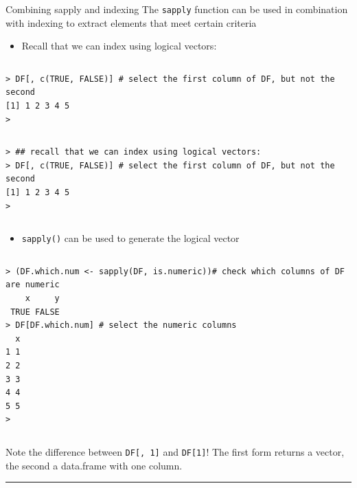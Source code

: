 \documentclass[table,smaller]{beamer}
\begin{document}
\begin{frame}[fragile,label=sec-4-3]{Combining sapply and indexing}
 The \texttt{sapply} function can be used in combination with indexing to extract elements that meet certain criteria
\begin{itemize}
\item Recall that we can index using logical vectors:
\end{itemize}
\vspace{-.5em}
\begin{columns}
\begin{block}{}
\begin{verbatim}
> DF[, c(TRUE, FALSE)] # select the first column of DF, but not the second
[1] 1 2 3 4 5
>
\end{verbatim}
\end{block}
\end{columns}
\vspace{.5em}

\vspace{-.5em}
\begin{columns}
\begin{block}{}
\begin{verbatim}
> ## recall that we can index using logical vectors:
> DF[, c(TRUE, FALSE)] # select the first column of DF, but not the second
[1] 1 2 3 4 5
>
\end{verbatim}
\end{block}
\end{columns}
\vspace{.5em}

\begin{itemize}
\item \texttt{sapply()} can be used to generate the logical vector
\end{itemize}
\vspace{-.5em}
\begin{columns}
\begin{block}{}
\begin{verbatim}
> (DF.which.num <- sapply(DF, is.numeric))# check which columns of DF are numeric
    x     y 
 TRUE FALSE 
> DF[DF.which.num] # select the numeric columns
  x
1 1
2 2
3 3
4 4
5 5
>
\end{verbatim}
\end{block}
\end{columns}
\vspace{.5em}

Note the difference between \texttt{DF[, 1]} and \texttt{DF[1]}! The first form returns a vector, the second a data.frame with one column. 

\rule{\linewidth}{0.5pt}
\end{frame}
\end{document}
